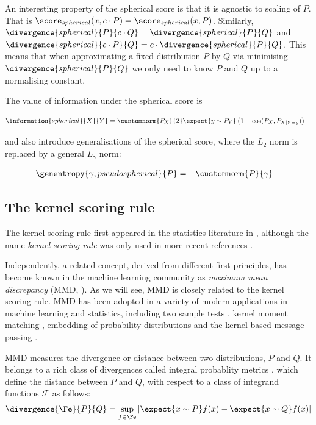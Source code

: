 An interesting property of the spherical score is that it is agnostic to scaling of $P$. That is $\score_{spherical}(x,c\cdot P) = \score_{spherical}(x,P) $. Similarly, $\divergence{spherical}{P}{c\cdot Q} = \divergence{spherical}{P}{Q}$ and $\divergence{spherical}{c\cdot P}{Q} = c \cdot \divergence{spherical}{P}{Q}$. This means that when approximating a fixed distribution $P$ by $Q$ via minimising $\divergence{spherical}{P}{Q}$ we only need to know $P$ and $Q$ up to a normalising constant.

The value of information under the spherical score is

\begin{align}
	\information{spherical}{X}{Y} &= \customnorm{P_X}{2}\expect{y \sim P_{Y}} \left( 1 - \cos(P_X,P_{X\vert Y=y}) \right)
\end{align}

\citet{Gneiting2007} and \citet{Jose2008} also introduce generalisations of the spherical score, where the $L_2$ norm is replaced by a general $L_\gamma$ norm:

\begin{align}
	\genentropy{\gamma,pseudospherical}{P} &= -\customnorm{P}{\gamma}
\end{align}

\subsection{The kernel scoring rule}

The kernel scoring rule first appeared in the statistics literature in \citep{Eaton1996}, although the name \emph{kernel scoring rule} was only used in more recent references \citep{Dawid1999,Dawid2007,Gneiting2007}.

Independently, a related concept, derived from different first principles, has become known in the machine learning community as \emph{maximum mean discrepancy} (MMD, \citep{Sriperumbudur2008}). As we will see, MMD is closely related to the kernel scoring rule. MMD has been adopted in a variety of modern applications in machine learning and statistics, including two sample tests \citep{Gretton2012}, kernel moment matching \citep{Song2008}, embedding of probability distributions \citep{Smola2007} and the kernel-based message passing \citep{Fukumizu2010}.

MMD measures the divergence or distance between two distributions, $P$ and $Q$. It belongs to a rich class of divergences called integral probablity metrics \citep{Sriperumbudur2009}, which define the distance between  $P$ and $Q$, with respect to a class of integrand functions $\mathcal{F}$ as follows:
%
\begin{align}
	\divergence{\Fe}{P}{Q} = \sup_{f\in\Fe}\left\vert \expect{x\sim P} f(x) - \expect{x\sim Q} f(x) \right\vert
\end{align}
	
